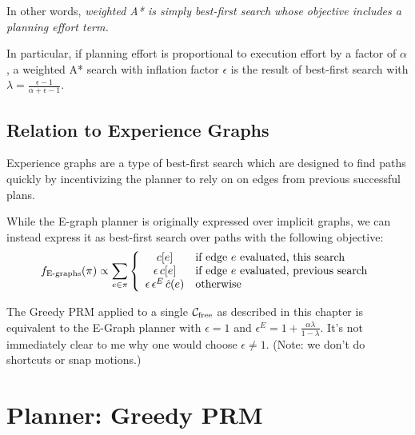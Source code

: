 In other words,
\emph{weighted A* is simply best-first search whose objective
   includes a planning effort term.}

In particular, if planning effort is proportional to execution
effort by a factor of $\alpha$,
a weighted A* search with inflation factor $\epsilon$
is the result of best-first search with
$\lambda = \frac{\epsilon-1}{\alpha+\epsilon-1}$.

\subsection{Relation to Experience Graphs}
\label{sec:egraphs}

Experience graphs \cite{phillips2012egraphs}
are a type of best-first search which
are designed to find paths quickly by incentivizing the planner
to rely on on edges from previous successful plans.

While the E-graph planner is originally expressed over implicit graphs,
we can instead express it as best-first search over paths
with the following objective:
\begin{equation}
   f_{\mbox{\scriptsize E-graphs}}(\pi) \propto \sum_{e \in \pi} \left\{
   \begin{array}{cl}
      c[e] & \mbox{if edge } e \mbox{ evaluated, this search} \\
      \epsilon \, c[e] & \mbox{if edge } e \mbox{ evaluated, previous search} \\
     \epsilon \, \epsilon^E \, \hat{c}(e) & \mbox{otherwise} \\
   \end{array}
   \right.
\end{equation}

The Greedy PRM applied to a single
$\mathcal{C}_{\mbox{\scriptsize free}}$ as described in this chapter
is equivalent to the E-Graph planner
with $\epsilon=1$ and $\epsilon^E = 1 + \frac{\alpha \lambda}{1-\lambda}$.
It's not immediately clear to me why one would choose $\epsilon \neq 1$.
(Note: we don't do shortcuts or snap motions.)

\section{Planner: Greedy PRM}
\label{sec:greedy-prm}


